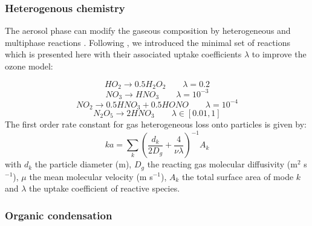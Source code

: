 \subsubsection*{Heterogenous chemistry}
The aerosol phase can modify the gaseous composition by heterogeneous and 
multiphase reactions
\citep{Ravi1997}. Following \citet{Jacob2000}, we introduced the 
minimal set of reactions which is presented here with their associated uptake 
coefficients $\lambda$ to improve the  ozone model:

\begin{equation}
HO_2 \rightarrow 0.5 H_2O_2 \qquad   \lambda = 0.2 
\label{hetero1}
\end{equation}
\begin{equation}
NO_3 \rightarrow HNO_3   \qquad   \lambda = 10^{-3} 
\label{hetero2}
\end{equation}
\begin{equation}
NO_2 \rightarrow 0.5 HNO_3 + 0.5 HONO  \qquad    \lambda = 10^{-4}  
\label{hetero3}
\end{equation}
\begin{equation}
N_2O_5 \rightarrow 2 HNO_3 \qquad    \lambda \in [0.01,1] 
\label{hetero4}
\end{equation}
The first order rate constant for gas heterogeneous loss onto particles is given 
by:\\
\begin{equation}
ka = \sum_{k}\left(\frac{d_k}{2D_g} +  \frac{4}{\nu \lambda} \right)^{-1} A_k
\label{ka}
\end{equation}
with $d_k$ the particle diameter (m), $D_g$ the reacting gas molecular 
diffusivity (m$^2$ s$^{-1}$), $\mu$ 
the mean molecular velocity (m s$^{-1}$), $A_k$ the total surface area of mode 
$k$ and $\lambda$ the uptake coefficient of reactive species.

\subsubsection*{Organic condensation}

